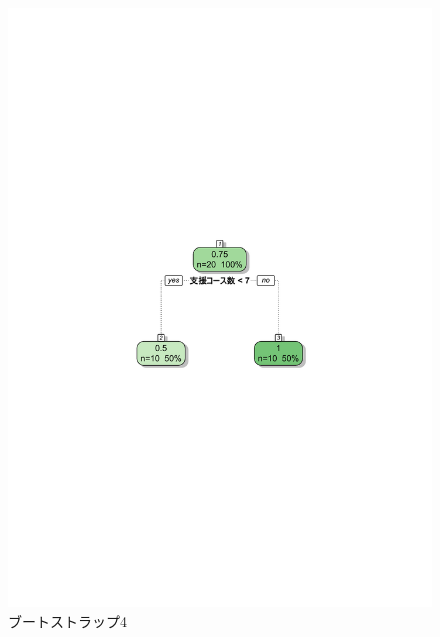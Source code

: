 \begin{figure}[H]
\centering
\includegraphics[width=13cm]{figure48.pdf}
\caption{ブートストラップ4}\label{sannp}
\end{figure}

